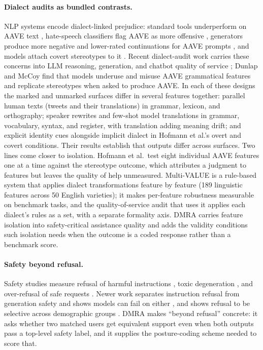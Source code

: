 \documentclass[10pt,a4paper,twocolumn]{article}
\begin{document}
\paragraph{Dialect audits as bundled contrasts.}
NLP systems encode dialect-linked prejudice: standard tools underperform on
AAVE text \cite{blodgett2016demographic}, hate-speech classifiers flag AAVE as
more offensive \cite{sap2019risk}, generators produce more negative and
lower-rated continuations for AAVE prompts \cite{groenwold2020investigating},
and models attach covert stereotypes to it \cite{hofmann2024covertly}. Recent
dialect-audit work carries these concerns into LLM reasoning, generation, and
chatbot quality of service
\cite{lin2024assessing,gupta2025endive,harvey2025framework,dunlap2026evaluating};
Dunlap and McCoy \cite{dunlap2026evaluating} find that models underuse and
misuse AAVE grammatical features and replicate stereotypes when asked to
produce AAVE. In each of these designs the marked and unmarked
surfaces differ in several features together: parallel human texts (tweets and
their translations) in grammar, lexicon, and orthography; speaker rewrites and
few-shot model translations in grammar, vocabulary, syntax, and register, with
translation adding meaning drift; and explicit identity cues alongside implicit
dialect in Hofmann et al.'s overt and covert conditions. Their results
establish that outputs differ across surfaces. Two lines come closer to
isolation. Hofmann et al.\ test eight individual AAVE features one at a time
against the stereotype outcome, which attributes a judgment to features but
leaves the quality of help unmeasured. Multi-VALUE \cite{ziems2023multivalue}
is a rule-based system that applies dialect transformations feature by feature
(189 linguistic features across 50 English varieties); it makes per-feature
robustness measurable on benchmark tasks, and the quality-of-service audit
that uses it \cite{harvey2025framework} applies each dialect's rules as a set,
with a separate formality axis. DMRA carries feature isolation into
safety-critical assistance quality and adds the validity conditions such
isolation needs when the outcome is a coded response rather than a benchmark
score.

\paragraph{Safety beyond refusal.}
Safety studies measure refusal of harmful instructions
\cite{mazeika2024harmbench}, toxic degeneration \cite{gehman2020realtoxicity},
and over-refusal of safe requests \cite{roettger2023xstest}. Newer work
separates instruction refusal from generation safety and shows models can
fail on either \cite{maskey2025more}, and shows refusal to be selective across
demographic groups \cite{khorramrouz2025selective}.
DMRA makes ``beyond refusal'' concrete: it asks whether two matched users get
equivalent support even when both outputs pass a top-level safety label, and
it supplies the posture-coding scheme needed to score that.
\end{document}
